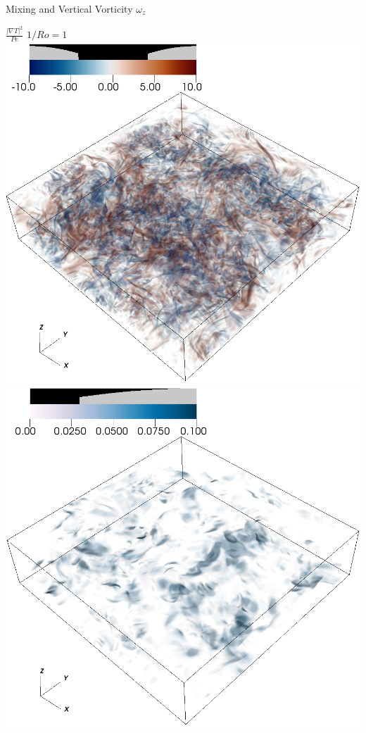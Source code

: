 \documentclass{beamer}
\begin{document}
\begin{frame}{Mixing and Vertical Vorticity}
    \centering
        $\omega_z$

        \vspace{75pt}

        $\frac{|\nabla T|^2}{Pe}$
    \emp
        \centering
        $1/Ro = 1$
        \includegraphics[width=.95\textwidth]{images/vortz_Om0.5_vr2.png}
        \includegraphics[width=.95\textwidth]{images/chi_Om0.5_vr2.png}

\end{frame}
\end{document}
